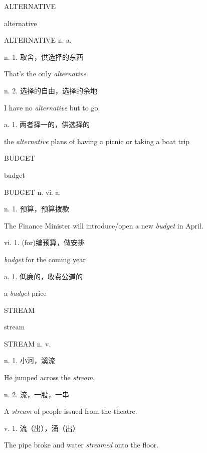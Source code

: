 \begin{flashcard}{
ALTERNATIVE

alternative
}
\begin{center}
ALTERNATIVE n. a. 
\end{center}
n. 1. 取舍，供选择的东西

That's the only \textit{alternative}.

n. 2. 选择的自由，选择的余地

I have no \textit{alternative} but to go.

a. 1. 两者择一的，供选择的

the \textit{alternative} plans of having a picnic or taking a boat trip

\end{flashcard}
\begin{flashcard}{
BUDGET

budget
}
\begin{center}
BUDGET n. vi. a. 
\end{center}
n. 1. 预算，预算拨款

The Finance Minister will introduce/open a new \textit{budget} in April.

vi. 1. (for)编预算，做安排

\textit{budget} for the coming year

a. 1. 低廉的，收费公道的

a \textit{budget} price

\end{flashcard}
\begin{flashcard}{
STREAM

stream
}
\begin{center}
STREAM n. v. 
\end{center}
n. 1. 小河，溪流

He jumped across the \textit{stream}.

n. 2. 流，一股，一串

A \textit{stream} of people issued from the theatre.

v. 1. 流（出），涌（出）

The pipe broke and water \textit{streamed} onto the floor.

\end{flashcard}
